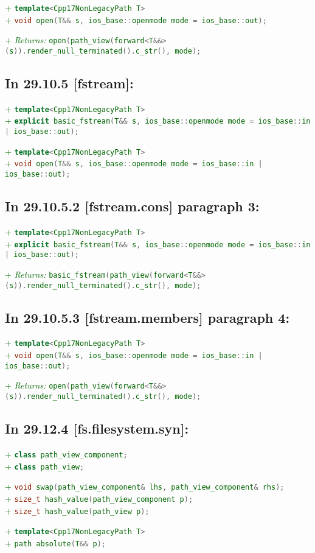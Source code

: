 \documentclass[11pt]{article}
\newcommand{\code}[2][cpp]{\lstinline[language=#1,basicstyle=\small\ttfamily]{#2}}
\newcommand{\desc}[1]{\textit{#1}}
\newcommand{\returns}{\desc{Returns: }}
\newcommand{\tsrefp}[3]{\subsection*{In #2 \textbf{[#1]} paragraph #3:}}
\newcommand{\tsref}[2]{\subsection*{In #2 \textbf{[#1]}:}}
\newcommand{\tsreplace}[3]{\textcolor{red}{\sout{#1}}#2\textcolor{darkgreen}{#3}}
\begin{document}
\tsreplace{}{}{+ \code{template<Cpp17NonLegacyPath T>}}\\
\tsreplace{}{}{+ \code{void open(T&& s, ios_base::openmode mode = ios_base::out);}}

\tsreplace{}{}{+ \returns \code{open(path_view(forward<T&&>(s)).render_null_terminated().c_str(), mode);}}


\tsref{fstream}{29.10.5}

\tsreplace{}{}{+ \code{template<Cpp17NonLegacyPath T>}}\\
\tsreplace{}{}{+ \code{explicit basic_fstream(T&& s, ios_base::openmode mode = ios_base::in | ios_base::out);}}

\tsreplace{}{}{+ \code{template<Cpp17NonLegacyPath T>}}\\
\tsreplace{}{}{+ \code{void open(T&& s, ios_base::openmode mode = ios_base::in | ios_base::out);}}


\tsrefp{fstream.cons}{29.10.5.2}{3}

\tsreplace{}{}{+ \code{template<Cpp17NonLegacyPath T>}}\\
\tsreplace{}{}{+ \code{explicit basic_fstream(T&& s, ios_base::openmode mode = ios_base::in | ios_base::out);}}

\tsreplace{}{}{+ \returns \code{basic_fstream(path_view(forward<T&&>(s)).render_null_terminated().c_str(), mode);}}


\tsrefp{fstream.members}{29.10.5.3}{4}

\tsreplace{}{}{+ \code{template<Cpp17NonLegacyPath T>}}\\
\tsreplace{}{}{+ \code{void open(T&& s, ios_base::openmode mode = ios_base::in | ios_base::out);}}

\tsreplace{}{}{+ \returns \code{open(path_view(forward<T&&>(s)).render_null_terminated().c_str(), mode);}}


\tsref{fs.filesystem.syn}{29.12.4}

\tsreplace{}{}{+ \code{class path_view_component;}}\\
\tsreplace{}{}{+ \code{class path_view;}}

\tsreplace{}{}{+ \code{void swap(path_view_component& lhs, path_view_component& rhs);}}\\
\tsreplace{}{}{+ \code{size_t hash_value(path_view_component p);}}\\
\tsreplace{}{}{+ \code{size_t hash_value(path_view p);}}

\tsreplace{}{}{+ \code{template<Cpp17NonLegacyPath T>}}\\
\tsreplace{}{}{+ \code{path absolute(T&& p);}}
\end{document}
